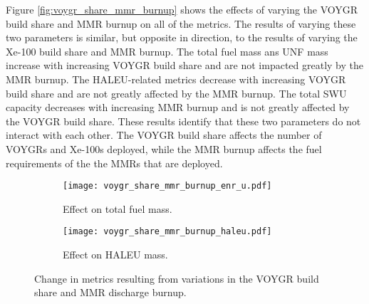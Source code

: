 Figure \ref{fig:voygr_share_mmr_burnup} shows the effects of varying 
the VOYGR build share and \gls{MMR} burnup on all of the metrics. The 
results of varying these two parameters is similar, but opposite in 
direction, to the results of varying the Xe-100 build share and 
\gls{MMR} burnup. The total fuel mass ans \gls{UNF} mass increase 
with increasing VOYGR build share and are not impacted greatly by the 
\gls{MMR} burnup. The \gls{HALEU}-related metrics decrease with 
increasing VOYGR build share and are not greatly affected by the 
\gls{MMR} burnup. The total \gls{SWU} capacity decreases with increasing 
\gls{MMR} burnup and is not greatly affected by the VOYGR build share. 
These results identify that these two parameters do not 
interact with each other. The VOYGR build share affects the number of 
VOYGRs and Xe-100s deployed, while the \gls{MMR} burnup affects the 
fuel requirements of the the \glspl{MMR} that are deployed. 

\begin{figure}
    \begin{subfigure}[h!]{0.48\textwidth}
        \centering
        \texttt{[image: voygr\_share\_mmr\_burnup\_enr\_u.pdf]}
        \caption{Effect on total fuel mass.}
        \label{fig:voygr_share_mmr_burnupenr_u}
    \end{subfigure}
    \hfill
    \begin{subfigure}[h!]{0.48\textwidth}
        \centering
        \texttt{[image: voygr\_share\_mmr\_burnup\_haleu.pdf]}
        \caption{Effect on HALEU mass.}
        \label{fig:voygr_share_mmr_burnup_haleu}
    \end{subfigure}
    \caption{Change in metrics resulting from variations in the 
    VOYGR build share and MMR discharge burnup.}
\end{figure}

